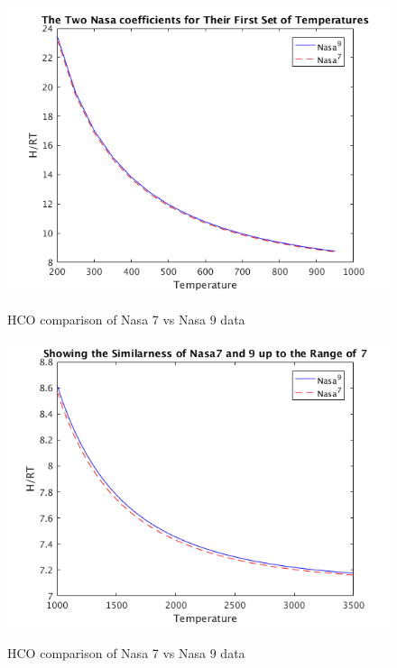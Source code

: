 \documentclass{article}
\begin{document}
\begin{figure}
  \centering
  \includegraphics[width=\textwidth]{H1.png}
  \label{fig:H1}
  \caption{HCO comparison of Nasa 7 vs Nasa 9 data}
\end{figure}


\begin{figure}
  \centering
  \includegraphics[width=\textwidth]{H2.png}
  \label{fig:H2}
  \caption{HCO comparison of Nasa 7 vs Nasa 9 data}
\end{figure}
\end{document}
